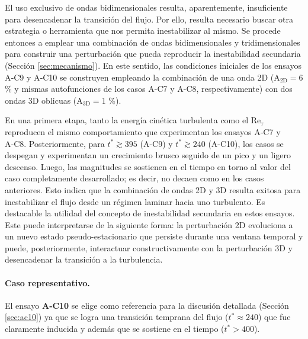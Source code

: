 El uso exclusivo de ondas bidimensionales resulta, aparentemente, insuficiente para desencadenar la transición del flujo. Por ello, resulta necesario buscar otra estrategia o herramienta que nos permita inestabilizar al mismo. Se procede entonces a emplear una combinación de \linebreak ondas bidimensionales y tridimensionales para construir una perturbación que pueda reproducir la inestabilidad secundaria (Sección \ref{sec:mecanismo}). En este sentido, las condiciones iniciales de los \linebreak ensayos A‑C9 y A‑C10 se construyen empleando la combinación de una onda 2D \linebreak (A$_\text{2D}=6$ \% y mismas autofunciones de los casos A-C7 y A-C8, respectivamente) con dos ondas 3D oblicuas (A$_\text{3D}=1$ \%). 

En una primera etapa, tanto la energía cinética turbulenta como el Re$_{\tau}$ reproducen el mismo comportamiento que experimentan los ensayos A‑C7 y A‑C8. Posteriormente, para $t^* \gtrsim 395$ (A-C9) y $t^* \gtrsim 240$ (A-C10), los casos se despegan y experimentan un crecimiento \linebreak brusco seguido de un pico y un ligero descenso. Luego, las magnitudes se sostienen en el tiempo en torno al valor del caso completamente desarrollado; es decir, no decaen como en los casos anteriores. Esto indica que la combinación de ondas 2D y 3D resulta exitosa para inestabilizar el flujo desde un régimen laminar hacia uno turbulento. Es destacable la utilidad del concepto de inestabilidad secundaria en estos ensayos. Este puede interpretarse de la siguiente forma: la perturbación 2D evoluciona a un nuevo estado pseudo-estacionario que persiste durante una ventana temporal y puede, posteriormente, interactuar constructivamente con la perturbación 3D y desencadenar la transición a la turbulencia.


\paragraph{Caso representativo.} El ensayo \textbf{A‑C10} se elige como referencia para la discusión \linebreak detallada (Sección \ref{sec:ac10}) ya que se logra una transición temprana del flujo ($t^* \approx 240$) que fue claramente inducida y además que se sostiene en el tiempo ($t^*>400$). 


